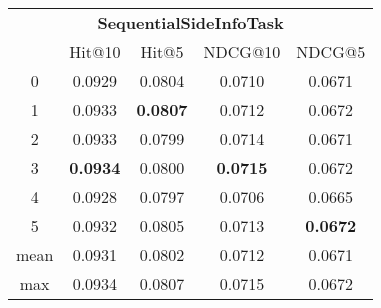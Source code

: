 \documentclass{article}
\begin{document}
 

\begin{tabular}{c|cccc}

\multicolumn{5}{c}{\textbf{SequentialSideInfoTask}} \\
\noalign{\smallskip}
\noalign{\smallskip}
\toprule
\multicolumn{1}{c}{Template ID}	&	\multicolumn{1}{|c}{Hit@10}	&	\multicolumn{1}{c}{Hit@5}	&	\multicolumn{1}{c}{NDCG@10}	&	\multicolumn{1}{c}{NDCG@5}\\
\midrule
0	&	0.0929	&	0.0804	&	0.0710	&	0.0671\\
1	&	0.0933	&	\textbf{0.0807}	&	0.0712	&	0.0672\\
2	&	0.0933	&	0.0799	&	0.0714	&	0.0671\\
3	&	\textbf{0.0934}	&	0.0800	&	\textbf{0.0715}	&	0.0672\\
4	&	0.0928	&	0.0797	&	0.0706	&	0.0665\\
5	&	0.0932	&	0.0805	&	0.0713	&	\textbf{0.0672}\\
\midrule
mean	&	0.0931	&	0.0802	&	0.0712	&	0.0671\\
max	&	0.0934	&	0.0807	&	0.0715	&	0.0672\\
\bottomrule

\end{tabular}
\end{document}
